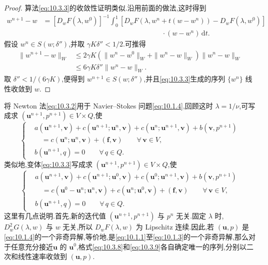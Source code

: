 \begin{proof}
算法\eqref{eq:10.3.3}的收敛性证明类似.沿用前面的做法,这时得到
\[
  \begin{aligned}
    w^{n+1}-w
      &=[D_wF(\lambda,w^0)]^{-1}
        \int_0^1[D_wF(\lambda,w^n+t(w-w^n))-D_wF(\lambda,w^0)]\\
      &\hspace{17em}\cdot(w-w^n)\,\mathrm dt .
  \end{aligned}
\]
假设 \(w^n\in S(w;\delta'')\),并取 \(\gamma K\delta''<1/2\).可推得
\[
  \begin{aligned}
    \|w^{n+1}-w\|_W
      &\le2\gamma K(\|w^n-w^0\|_W+\|w^n-w\|_W)\|w^n-w\|_W\\
      &\le6\gamma K\delta''\|w^n-w\|_W.
  \end{aligned}
\]
取 \(\delta''<1/(6\gamma K)\),便得到 \(w^{n+1}\in S(w;\delta'')\),并且\eqref{eq:10.3.3}生成的序列 \(\{w^n\}\) 线性收敛到 \(w\).
\end{proof}

将 Newton 法\eqref{eq:10.3.2}用于 Navier--Stokes 问题\eqref{eq:10.1.4},回顾这时 \(\lambda=1/\nu\),可写成求 \((\boldsymbol{u}^{n+1},p^{n+1})\in V\times Q\),使
\begin{equation}\label{eq:10.3.8}
  \left\{
  \begin{aligned}
    &a(\boldsymbol{u}^{n+1},\boldsymbol{v})+c(\boldsymbol{u}^{n+1};\boldsymbol{u}^n,\boldsymbol{v})
      +c(\boldsymbol{u}^n;\boldsymbol{u}^{n+1},\boldsymbol{v})+b(\boldsymbol{v},p^{n+1})\\
    &\quad=c(\boldsymbol{u}^n;\boldsymbol{u}^n,\boldsymbol{v})+(\boldsymbol{f},\boldsymbol{v})
              \qquad\forall\,\boldsymbol{v}\in V,\\
    &b(\boldsymbol{u}^{n+1},q)=0\qquad\forall\,q\in Q.
  \end{aligned}
  \right.
\end{equation}
类似地,变体\eqref{eq:10.3.3}写成求 \((\boldsymbol{u}^{n+1},p^{n+1})\in V\times Q\),使
\begin{equation}\label{eq:10.3.9}
  \left\{
  \begin{aligned}
    &a(\boldsymbol{u}^{n+1},\boldsymbol{v})+c(\boldsymbol{u}^{n+1};\boldsymbol{u}^0,\boldsymbol{v})
      +c(\boldsymbol{u}^0;\boldsymbol{u}^{n+1},\boldsymbol{v})+b(\boldsymbol{v},p^{n+1})\\
    &\quad=c(\boldsymbol{u}^0-\boldsymbol{u}^n;\boldsymbol{u}^n,\boldsymbol{v})
       +c(\boldsymbol{u}^n;\boldsymbol{u}^0,\boldsymbol{v})+(\boldsymbol{f},\boldsymbol{v})
          \qquad\forall\,\boldsymbol{v}\in V,\\
    &b(\boldsymbol{u}^{n+1},q)=0\qquad\forall\,q\in Q .
  \end{aligned}
  \right.
\end{equation}
这里有几点说明.首先,新的迭代值 \((\boldsymbol{u}^{n+1},p^{n+1})\) 与 \(p^n\) 无关.固定 \(\lambda\) 时,\(D_w^2G(\lambda,w)\) 与 \(w\) 无关,所以 \(D_wF(\lambda,w)\) 为 Lipschitz 连续.因此,若 \((\boldsymbol{u},p)\) 是\eqref{eq:10.1.4}的一个非奇异解,等价地,是\eqref{eq:10.1.1}至\eqref{eq:10.1.3}的一个非奇异解,那么对于任意充分接近\(\boldsymbol{u}\) 的 \(\boldsymbol{u}^0\),格式\eqref{eq:10.3.8}和\eqref{eq:10.3.9}各自确定唯一的序列,分别以二次和线性速率收敛到 \((\boldsymbol{u},p)\).


